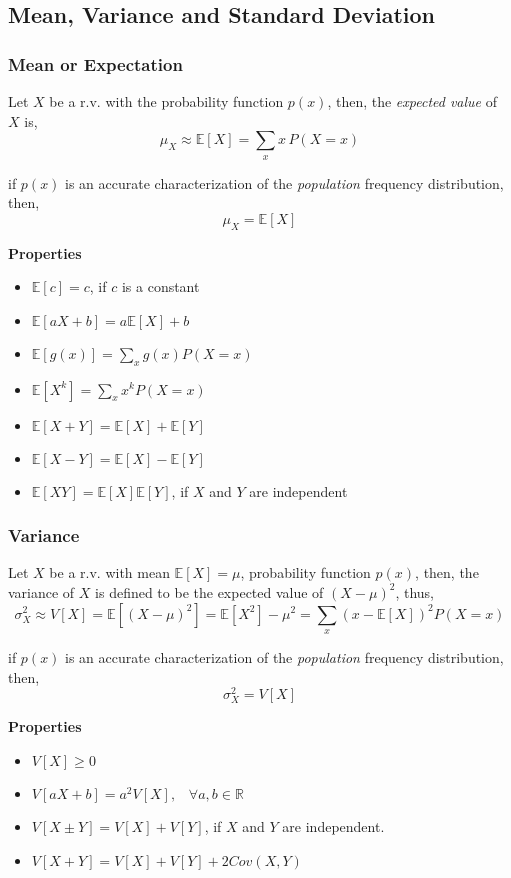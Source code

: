 \subsection{Mean, Variance and Standard Deviation}
\subsubsection{Mean or Expectation}
Let $X$ be a r.v. with the probability function $p(x)$, then, the \textit{expected value} of $X$ is,
\[ \mu_{X} \approx \mathbb{E}[X] = \sum_{x} x\,P(X=x) \]

if $p(x)$ is an accurate characterization of the \textit{population} frequency distribution, then,
\[ \mu_{X} = \mathbb{E}[X] \]

\textbf{Properties}
\begin{itemize}
    \item $\mathbb{E}[c] = c$, if $c$ is a constant
    \item $\mathbb{E}[aX+b]=a\mathbb{E}[X]+b$
    \item $\mathbb{E}[g(x)]=\sum_{x}g(x)P(X=x)$
    \item $\mathbb{E}[X^k] = \sum_{x} x^k P(X=x)$
    \item $\mathbb{E}[X+Y] = \mathbb{E}[X] + \mathbb{E}[Y]$
    \item $\mathbb{E}[X-Y] = \mathbb{E}[X] - \mathbb{E}[Y]$
    \item $\mathbb{E}[XY] = \mathbb{E}[X]\mathbb{E}[Y]$, if $X$ and $Y$ are independent
\end{itemize}

\subsubsection{Variance}
Let $X$ be a r.v. with mean $\mathbb{E}[X] = \mu$, probability function $p(x)$, then, the variance of $X$ is defined to be the expected value of $(X-\mu)^2$, thus,
\[ \sigma^2_X \approx V[X] = \mathbb{E}[(X-\mu)^2] = \mathbb{E}[X^2] - \mu^2 = \sum_{x}(x-\mathbb{E}[X])^2 P(X=x) \]

if $p(x)$ is an accurate characterization of the \textit{population} frequency distribution, then,
\[ \sigma^2_{X} =  V[X] \]

\textbf{Properties}
\begin{itemize}
    \item $V[X] \geq 0$
    \item $V[aX + b] = a^2V[X], \;\;\; \forall a,b \in \mathbb{R}$
    \item $V[X \pm Y] = V[X] + V[Y]$, if $X$ and $Y$ are independent.
    \item $V[X + Y] = V[X] + V[Y] + 2Cov(X,Y)$
\end{itemize}

